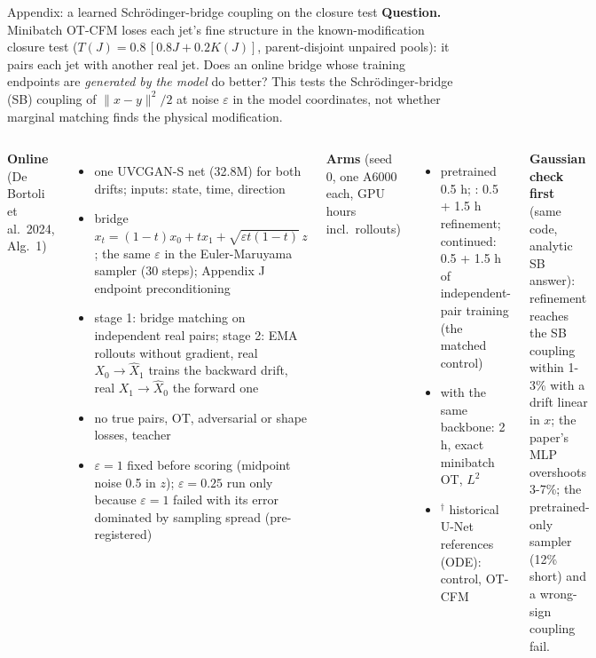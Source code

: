 
\begin{frame}{Appendix: a learned Schr\"odinger-bridge coupling on the closure test}
\small
\textbf{Question.} Minibatch OT-CFM loses each jet's fine structure in the known-modification closure
test ($T(J) = 0.8\,[0.8J + 0.2K(J)]$, parent-disjoint unpaired pools): it pairs each jet with another
real jet. Does an online bridge whose training endpoints are \emph{generated by the model} do better?
This tests the Schr\"odinger-bridge (SB) coupling of $\|x - y\|^2/2$ at noise $\varepsilon$ in the model
coordinates, not whether marginal matching finds the physical modification.

\vspace{0.2em}
\begin{columns}[T]
\footnotesize
\textbf{Online \dsbm{}} (De Bortoli et al.\ 2024, Alg.\ 1)
\begin{itemize}\setlength\itemsep{0.02em}
\item one UVCGAN-S net (32.8M) for both drifts; inputs: state, time, direction
\item bridge $x_t = (1-t)x_0 + t x_1 + \sqrt{\varepsilon t(1-t)}\,z$; the same $\varepsilon$ in the
  Euler-Maruyama sampler (30 steps); Appendix J endpoint preconditioning
\item stage 1: bridge matching on independent real pairs; stage 2: EMA rollouts without gradient,
  real $X_0 \to \hat X_1$ trains the backward drift, real $X_1 \to \hat X_0$ the forward one
\item no true pairs, OT, adversarial or shape losses, teacher
\item $\varepsilon = 1$ fixed before scoring (midpoint noise 0.5 in $z$); $\varepsilon = 0.25$ run only
  because $\varepsilon = 1$ failed with its error dominated by sampling spread (pre-registered)
\end{itemize}
\footnotesize
\textbf{Arms} (seed 0, one A6000 each, GPU hours incl.\ rollouts)
\begin{itemize}\setlength\itemsep{0.02em}
\item \br{} pretrained 0.5 h; \dsbm{}: 0.5 + 1.5 h refinement; \br{} continued: 0.5 + 1.5 h of
  independent-pair training (the matched control)
\item \ot{} with the same backbone: 2 h, exact minibatch OT, $L^2$
\item $^\dagger$ historical U-Net references (ODE): \pai{} control, OT-CFM
\end{itemize}
\textbf{Gaussian check first} (same code, analytic SB answer): refinement reaches the SB coupling
within 1-3\% with a drift linear in $x$; the paper's MLP overshoots 3-7\%; the pretrained-only sampler
(12\% short) and a wrong-sign coupling fail.
\end{columns}
\end{frame}

